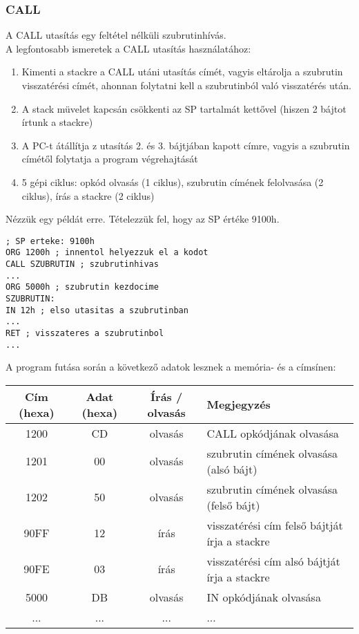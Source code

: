 \subsubsection{CALL}
A CALL utasítás egy feltétel nélküli szubrutinhívás. \\
A legfontosabb ismeretek a CALL utasítás használatához:
\begin{enumerate}
  \item Kimenti a stackre a CALL utáni utasítás címét, vagyis eltárolja a szubrutin visszatérési címét, ahonnan folytatni kell a szubrutinból való visszatérés után.
  \item A stack müvelet kapcsán csökkenti az SP tartalmát kettővel (hiszen 2 bájtot írtunk a stackre)
  \item A PC-t átállítja z utasítás 2. és 3. bájtjában kapott címre, vagyis a szubrutin címétől folytatja a program végrehajtását
  \item 5 gépi ciklus: opkód olvasás (1 ciklus), szubrutin címének felolvasása (2 ciklus), írás a stackre (2 ciklus)
\end{enumerate}
Nézzük egy példát erre. Tételezzük fel, hogy az SP értéke 9100h.
\begin{lstlisting}[frame=single]
; SP erteke: 9100h
ORG 1200h ; innentol helyezzuk el a kodot
CALL SZUBRUTIN ; szubrutinhivas
...
ORG 5000h ; szubrutin kezdocime
SZUBRUTIN:
IN 12h ; elso utasitas a szubrutinban
...
RET ; visszateres a szubrutinbol
...
\end{lstlisting}
A program futása során a következő adatok lesznek a memória- és a címsínen:
\begin{center}
\begin{tabular}{ |c|c|c|l| }
 \hline
 Cím (hexa) & Adat (hexa) & Írás / olvasás & Megjegyzés \\ \hline
 1200 & CD & olvasás & CALL opkódjának olvasása \\ \hline
 1201 & 00 & olvasás & szubrutin címének olvasása (alsó bájt) \\ \hline
 1202 & 50 & olvasás & szubrutin címének olvasása (felső bájt) \\ \hline
 90FF & 12 & írás & visszatérési cím felső bájtját írja a stackre \\ \hline
 90FE & 03 & írás & visszatérési cím alsó bájtját írja a stackre \\ \hline
 5000 & DB & olvasás & IN opkódjának olvasása \\ \hline
 ... & ... & ... & ... \\ \hline
\end{tabular}
\end{center}

